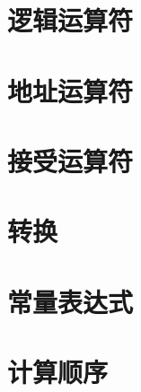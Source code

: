\section{逻辑运算符}
\section{地址运算符}
\section{接受运算符}
\section{转换}
\section{常量表达式}
\section{计算顺序}















